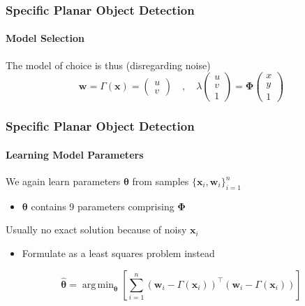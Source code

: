 \documentclass[xetex,professionalfont]{beamer}
\DeclareMathOperator*{\argmin}{arg\,min}
\renewcommand{\vec}[1]{\ensuremath{\mathbf{#1}}}
\newcommand{\vw}{\vec{w}}
\newcommand{\vx}{\vec{x}}
\newcommand{\bth}{\boldsymbol{\theta}}
\renewcommand\emph[1]{\textcolor{tuwcvl_inf_red}{#1}}
\begin{document}
\begin{frame}
\frametitle{Specific Planar Object Detection}
\framesubtitle{Model Selection}

The model of choice is thus (disregarding noise)
\[
	\vw=\Gamma(\vx)=
	\begin{pmatrix}
		u \\ v
	\end{pmatrix}\quad,\quad
	\lambda
	\begin{pmatrix}
		u \\ v \\ 1
	\end{pmatrix}
	= \boldsymbol{\Phi}
	\begin{pmatrix}
		x \\ y \\ 1
	\end{pmatrix}
\]

\end{frame}


\begin{frame}
\frametitle{Specific Planar Object Detection}
\framesubtitle{Learning Model Parameters}

We again learn parameters $\bth$ from samples $\{\vx_i,\vw_i\}_{i=1}^n$
\begin{itemize}
	\item $\bth$ contains 9 parameters comprising $\boldsymbol{\Phi}$
\end{itemize}

\bigskip
Usually no exact solution because of noisy $\vx_i$
\begin{itemize}
	\item Formulate as a \emph{least squares problem} instead
\end{itemize}

\[
	\hat{\bth}=\argmin_{\bth} \left[\sum_{i=1}^n (\vw_i-\Gamma(\vx_i))^\top(\vw_i-\Gamma(\vx_i)) \right]
\]

\end{frame}

\end{document}

